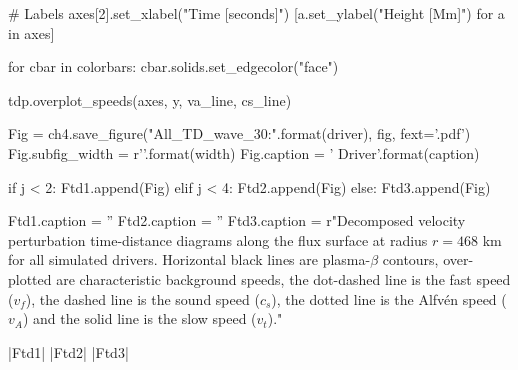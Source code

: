 \begin{pycode}[chapter4]
    # Labels
    axes[2].set_xlabel("Time [seconds]")
    [a.set_ylabel("Height [Mm]") for a in axes]
    
    
    for cbar in colorbars:
        cbar.solids.set_edgecolor("face")
    
    tdp.overplot_speeds(axes, y, va_line, cs_line)
    
    Fig = ch4.save_figure("All_TD_wave_30:{}".format(driver), fig, fext='.pdf')
    Fig.subfig_width = r'{}\columnwidth'.format(width)
    Fig.caption = '{} Driver'.format(caption)
    
    if j < 2:
        Ftd1.append(Fig)
    elif j < 4:
        Ftd2.append(Fig)
    else:
        Ftd3.append(Fig)


Ftd1.caption = ''
Ftd2.caption = ''
Ftd3.caption = r"Decomposed velocity perturbation time-distance diagrams along the flux surface at radius $r = 468$ km for all simulated drivers. Horizontal black lines are plasma-$\beta$ contours, over-plotted are characteristic background speeds, the dot-dashed line is the fast speed ($v_f$), the dashed line is the sound speed ($c_s$), the dotted line is the Alfv\'en speed ($v_A$) and the solid line is the slow speed ($v_t$)."
\end{pycode}

\py[chapter4]|Ftd1|
\py[chapter4]|Ftd2|
\py[chapter4]|Ftd3|





